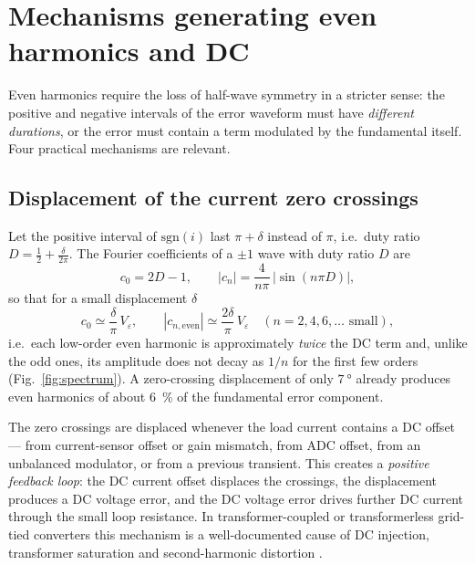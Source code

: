 \documentclass[11pt,a4paper]{article}
\begin{document}
\section{Mechanisms generating even harmonics and DC}
\label{sec:even}

Even harmonics require the loss of half-wave symmetry in a stricter sense: the positive
and negative intervals of the error waveform must have \emph{different durations}, or the
error must contain a term modulated by the fundamental itself. Four practical mechanisms
are relevant.

\subsection{Displacement of the current zero crossings}

Let the positive interval of $\mathrm{sgn}(i)$ last $\pi+\delta$ instead of $\pi$, i.e.\
duty ratio $D = \tfrac{1}{2} + \tfrac{\delta}{2\pi}$. The Fourier coefficients of a
$\pm 1$ wave with duty ratio $D$ are
\begin{equation}
c_0 = 2D-1, \qquad
|c_n| = \frac{4}{n\pi}\,\big|\sin(n\pi D)\big| ,
\label{eq:dutyfourier}
\end{equation}
so that for a small displacement $\delta$
\begin{equation}
c_0 \simeq \frac{\delta}{\pi}\,V_{\!\varepsilon}, \qquad
|c_{n,\text{even}}| \simeq \frac{2\delta}{\pi}\,V_{\!\varepsilon}
\quad (n=2,4,6,\dots \text{ small}),
\end{equation}
i.e.\ each low-order even harmonic is approximately \emph{twice} the DC term and, unlike
the odd ones, its amplitude does not decay as $1/n$ for the first few orders
(Fig.~\ref{fig:spectrum}). A zero-crossing displacement of only $\SI{7}{\degree}$ already
produces even harmonics of about \SI{6}{\percent} of the fundamental error component.

The zero crossings are displaced whenever the load current contains a DC offset --- from
current-sensor offset or gain mismatch, from ADC offset, from an unbalanced modulator, or
from a previous transient. This creates a \emph{positive feedback loop}: the DC current
offset displaces the crossings, the displacement produces a DC voltage error, and the DC
voltage error drives further DC current through the small loop resistance. In
transformer-coupled or transformerless grid-tied converters this mechanism is a
well-documented cause of DC injection, transformer saturation and second-harmonic
distortion \cite{buticchi2011,buticchi2013,sharma2005,armstrong2006,blaabjerg2006}.
\end{document}
